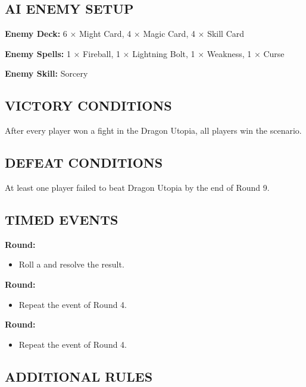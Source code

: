 \begin{multicols}{2}
\subsection*{\MakeUppercase{AI Enemy Setup}}

\textbf{Enemy Deck:} 6 × Might Card, 4 × Magic Card, 4 × Skill Card

\textbf{Enemy Spells:} 1 × Fireball, 1 × Lightning Bolt, 1 × Weakness, 1 × Curse

\textbf{Enemy Skill:} Sorcery

\subsection*{\MakeUppercase{Victory Conditions}}

After every player won a fight in the Dragon Utopia, all players win the scenario.

\subsection*{\MakeUppercase{Defeat Conditions}}

At least one player failed to beat Dragon Utopia by the end of Round 9.

\subsection*{\MakeUppercase{Timed Events}}
\textbf{ Round:}
\begin{itemize}
  \item Roll a  and resolve the result.
\end{itemize}
\textbf{ Round:}
\begin{itemize}
  \item Repeat the event of Round 4.
\end{itemize}
\textbf{ Round:}
\begin{itemize}
  \item Repeat the event of Round 4.
\end{itemize}

\subsection*{\MakeUppercase{Additional Rules}}


\end{multicols}
